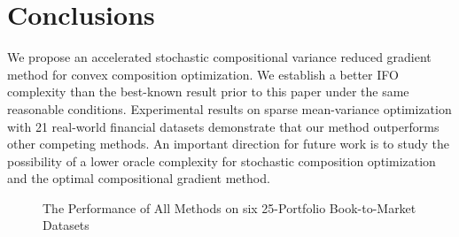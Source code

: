 \documentclass[11pt]{article}
\begin{document}
\section{Conclusions}\label{sec:conclusion}
We propose an accelerated stochastic compositional variance reduced gradient method for convex composition optimization. We establish a better IFO complexity than the best-known result prior to this paper under the same reasonable conditions. Experimental results on sparse mean-variance optimization with 21 real-world financial datasets demonstrate that our method outperforms other competing methods. An important direction for future work is to study the possibility of a lower oracle complexity for stochastic composition optimization and the optimal compositional gradient method. 
\begin{figure}[t] 
\hspace{-6em}
%
%
%
%
%
\caption{The Performance of All Methods on six 25-Portfolio Book-to-Market Datasets} \label{Fig:Book_to_Market}
\end{figure}
\end{document}
